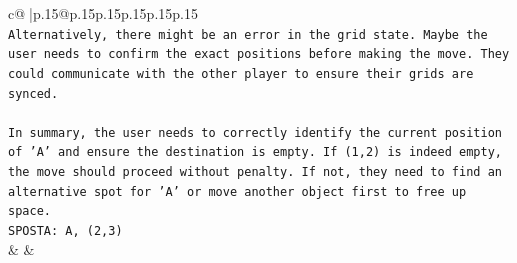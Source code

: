 \documentclass{article}
\begin{document}
{\begin{supertabular}{c@{$\;$}|p{.15\linewidth}@{}p{.15\linewidth}p{.15\linewidth}p{.15\linewidth}p{.15\linewidth}p{.15\linewidth}}
{{{\\ 
\texttt{Alternatively, there might be an error in the grid state. Maybe the user needs to confirm the exact positions before making the move. They could communicate with the other player to ensure their grids are synced.} \\
\\ 
\texttt{In summary, the user needs to correctly identify the current position of 'A' and ensure the destination is empty. If (1,2) is indeed empty, the move should proceed without penalty. If not, they need to find an alternative spot for 'A' or move another object first to free up space.} \\
\texttt{SPOSTA: A, (2,3)} \\
            }
        }
    }
    & & \\ \\


\end{supertabular}}
\end{document}
